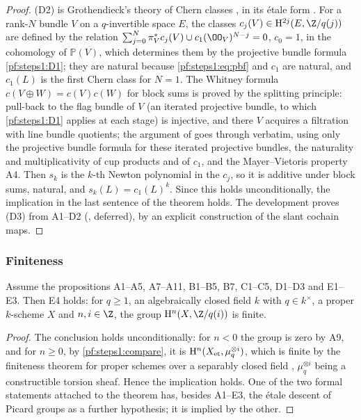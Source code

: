 \begin{proof}
(D2) is Grothendieck's theory of Chern classes \cite{Grothendieck1958}, in its \'etale form
\cite[Exp.~VII, \S3]{Grothendieck1977}. For a rank-$N$ bundle $V$ on a $q$-invertible space $E$, the classes $c_j(V)\in
\stepsIH^{2j}(E,\Z/q(j))$ are defined by the relation $\sum_{j=0}^N\pi_V^*c_j(V)\cup c_1(\OO_V)^{N-j}=0$, $c_0=1$, in the
cohomology of $\mathbb P(V)$, which determines them by the projective bundle formula \cref{pf:steps1:D1}; they are natural
because \eqref{pf:steps1:eq:pbf} and $c_1$ are natural, and $c_1(L)$ is the first Chern class for $N=1$. The Whitney formula
$c(V\oplus W)=c(V)c(W)$ for block sums is proved by the splitting principle: pull-back to the flag bundle of $V$ (an
iterated projective bundle, to which \cref{pf:steps1:D1} applies at each stage) is injective, and there $V$ acquires a
filtration with line bundle quotients; the argument of \cite[\S\S3--4]{Grothendieck1958} goes through verbatim, using only the
projective bundle formula for these iterated projective bundles, the naturality and multiplicativity of cup products and
of $c_1$, and the Mayer--Vietoris property A4. Then $s_k$ is the $k$-th Newton polynomial in
the $c_j$, so it is additive under block sums, natural, and $s_k(L)=c_1(L)^k$. Since this holds unconditionally, the
implication in the last sentence of the theorem holds. The development proves (D3) from A1--D2
(, deferred), by an explicit construction of the slant cochain maps.
\end{proof}

\subsubsection{Finiteness}

\begin{theorem}\label{pf:steps1:E4}
Assume the propositions A1--A5, A7--A11, B1--B5, B7, C1--C5, D1--D3 and E1--E3. Then E4 holds: for $q\ge1$, an
algebraically closed field $k$ with $q\in k^\times$, a proper $k$-scheme $X$ and $n,i\in\Z$, the group
$\stepsIH^n(X,\Z/q(i))$ is finite.
\end{theorem}

\begin{proof}
The conclusion holds unconditionally: for $n<0$ the group is zero by A9, and for $n\ge0$, by
\cref{pf:steps1:compare}, it is $\mathrm{H}^n(X_{\mathrm{et}},\mu_q^{\otimes i})$, which is finite by the finiteness
theorem for proper schemes over a separably closed field \cite[Exp.~XIV, Cor.~1.2]{ArtinGrothendieckVerdier1972},
$\mu_q^{\otimes i}$ being a constructible torsion sheaf. Hence the implication holds. One of the two formal statements
attached to the theorem has, besides A1--E3, the \'etale descent of Picard groups as a further hypothesis; it is implied
by the other.
\end{proof}

